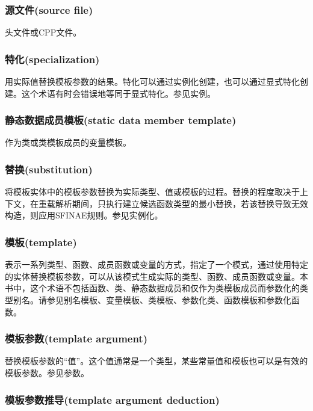 \subsubsection{源文件(source file)}

头文件或CPP文件。

\subsubsection{特化(specialization)}

用实际值替换模板参数的结果。特化可以通过实例化创建，也可以通过显式特化创建。这个术语有时会错误地等同于显式特化。参见实例。

\subsubsection{静态数据成员模板(static data member template)}

作为类或类模板成员的变量模板。

\subsubsection{替换(substitution)}

将模板实体中的模板参数替换为实际类型、值或模板的过程。替换的程度取决于上下文，在重载解析期间，只执行建立候选函数类型的最小替换，若该替换导致无效构造，则应用SFINAE规则。参见实例化。

\subsubsection{模板(template)}

表示一系列类型、函数、成员函数或变量的方式，指定了一个模式，通过使用特定的实体替换模板参数，可以从该模式生成实际的类型、函数、成员函数或变量。本书中，这个术语不包括函数、类、静态数据成员和仅作为类模板成员而参数化的类型别名。请参见别名模板、变量模板、类模板、参数化类、函数模板和参数化函数。

\subsubsection{模板参数(template argument)}

替换模板参数的“值”。这个值通常是一个类型，某些常量值和模板也可以是有效的模板参数。参见参数。

\subsubsection{模板参数推导(template argument deduction)}

